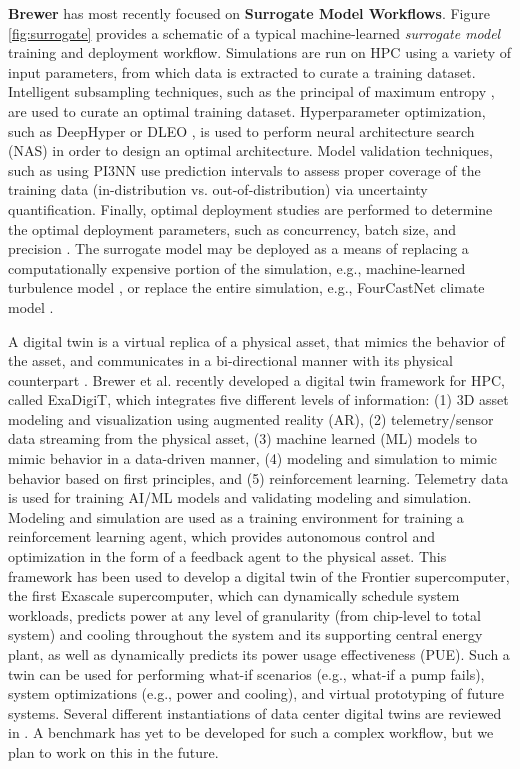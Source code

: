 \documentclass[utf8]{FrontiersinVancouver} %
\begin{document}
{\bf Brewer} has most recently focused on  {\bf Surrogate Model Workflows}. Figure \ref{fig:surrogate} provides a schematic of a typical machine-learned \textit{surrogate model} training and deployment workflow. Simulations are run on HPC using a variety of input parameters, from which data is extracted to curate a training dataset. Intelligent subsampling techniques, such as the principal of maximum entropy \cite{brewer2023entropy}, are used to curate an optimal training dataset. Hyperparameter optimization, such as DeepHyper \cite{balaprakash2018deephyper} or DLEO \cite{martinez2018deep}, is used to perform neural architecture search (NAS) in order to design an optimal architecture. Model validation techniques, such as using PI3NN \cite{liu2021pi3nn} use prediction intervals to assess proper coverage of the training data (in-distribution vs. out-of-distribution) via uncertainty quantification. Finally, optimal deployment studies are performed to determine the optimal deployment parameters, such as concurrency, batch size, and precision \cite{brewer2021production}. The surrogate model may be deployed as a means of replacing a computationally expensive portion of the simulation, e.g., machine-learned turbulence model \cite{bhushan2021development}, or replace the entire simulation, e.g., FourCastNet climate model \cite{pathak2022fourcastnet}.

A digital twin is a virtual replica of a physical asset, that mimics the behavior of the asset, and communicates in a bi-directional manner with its physical counterpart \cite{nas2023foundational}.   Brewer et al. \cite{brewer2024digital} recently developed a digital twin framework for HPC, called ExaDigiT, which integrates five different levels of information: (1) 3D asset modeling and visualization using augmented reality (AR), (2) telemetry/sensor data streaming from the physical asset, (3) machine learned (ML) models to mimic behavior in a data-driven manner, (4) modeling and simulation to mimic behavior based on first principles, and (5) reinforcement learning. Telemetry data is used for training AI/ML models and validating modeling and simulation. Modeling and simulation are used as a training environment for training a reinforcement learning agent, which provides autonomous control and optimization in the form of a feedback agent to the physical asset. This framework has been used to develop a digital twin of the Frontier supercomputer, the first Exascale supercomputer, which can dynamically schedule system workloads, predicts power at any level of granularity (from chip-level to total system) and cooling throughout the system and its supporting central energy plant, as well as dynamically predicts its power usage effectiveness (PUE). Such a twin can be used for performing what-if scenarios (e.g., what-if a pump fails), system optimizations (e.g., power and cooling), and virtual prototyping of future systems. Several different instantiations of data center digital twins are reviewed in \cite{athavale2024digital}. A benchmark has yet to be developed for such a complex workflow, but we plan to work on this in the future. 
\end{document}
